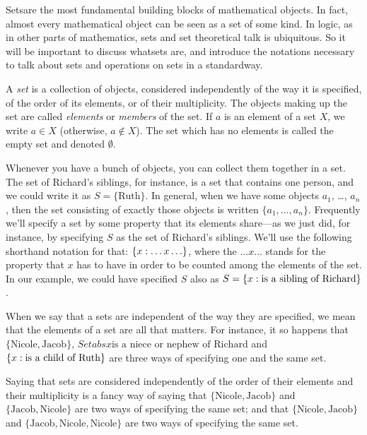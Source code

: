 \documentclass[open-logic-section]{subfiles}
\begin{document}

\begin{wordy}
Setsare the most fundamental building blocks of mathematical
objects. In fact, almost every mathematical object can be seen as a
set of some kind.  In logic, as in other parts of mathematics, sets
and set theoretical talk is ubiquitous.  So it will be important to
discuss whatsets are, and introduce the notations necessary to talk
about sets and operations on sets in a standardway.
\end{wordy}

\begin{defn}
A \emph{set} is a collection of objects, considered independently of
the way it is specified, of the order of its elements, or of their
multiplicity. The objects making up the set are called \emph{elements}
or \emph{members} of the set. If $a$ is an element of a set $X$, we
write $a \in X$ (otherwise, $a \notin X$). The set which has no elements
is called the empty set and denoted $\emptyset$.
\end{defn}

\begin{ex}
Whenever you have a bunch of objects, you can collect them together in
a set. The set of Richard's siblings, for instance, is a set that
contains one person, and we could write it as $S=\{\textrm{Ruth}\}$.
In general, when we have some objects $a_{1}$, \dots, $a_{n}$, then
the set consisting of exactly those objects is written $\{
a_{1},\ldots,a_{n}\}$.  Frequently we'll specify a set by some
property that its elements share---as we just did, for instance, by
specifying $S$ as the set of Richard's siblings. We'll use the
following shorthand notation for that: $\{ x : \ldots x\ldots \}$,
where the $\ldots x\ldots$ stands for the property that $x$ has to
have in order to be counted among the elements of the set. In our
example, we could have specified $S$ also as $S = \{ x : \text{is
a sibling of Richard} \}$. 
\end{ex}

\begin{wordy}
When we say that a sets are independent of the way they are specified,
we mean that the elements of a set are all that matters. For instance,
it so happens that $\{\text{Nicole}, \text{Jacob}\}$,
$Setabs{x}{\text{is a niece or nephew of Richard}}$ and
$\{ x : \text{is a child of Ruth} \}$ are three ways of specifying
one and the same set.

Saying that sets are considered independently of the order of their
elements and their multiplicity is a fancy way of saying that
$\{\text{Nicole}, \text{Jacob}\}$ and $\{\text{Jacob},
\text{Nicole}\}$ are two ways of specifying the same set; and that
$\{\text{Nicole}, \text{Jacob}\}$ and $\{\text{Jacob}, \text{Nicole},
\text{Nicole}\}$ are two ways of specifying the same set.
\end{wordy}
\end{document}
